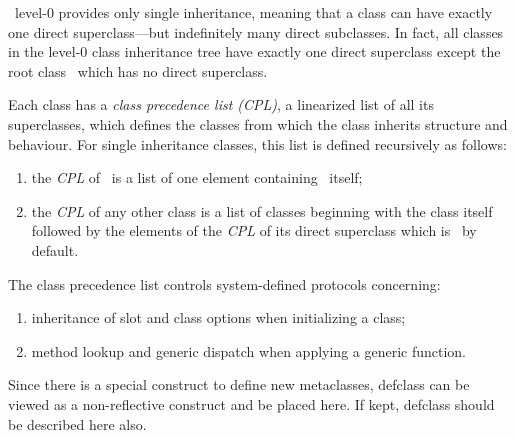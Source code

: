 \begin{optDefinition}
\noindent
\telos\ level-0 provides only single
inheritance, meaning that a class can have exactly one direct
superclass---but indefinitely many direct subclasses.  In fact, all classes in
the level-0 class inheritance tree have exactly one direct superclass except the
root class \ which has no direct superclass.

Each class has a {\em class precedence list (CPL)}, a linearized list of all its
superclasses, which defines the classes from which the class inherits structure
and behaviour. For single inheritance classes, this list is defined recursively
as follows:
\begin{enumerate}
    \item the {\em CPL\/} of \ is a list of one element
    containing \ itself;

    \item the {\em CPL\/} of any other class is a list of classes beginning with
    the class itself followed by the elements of the {\em CPL\/} of its direct
    superclass which is \ by default.
\end{enumerate}

The class precedence list controls system-defined protocols
concerning:
\begin{enumerate}
    \item inheritance of slot and class options when initializing a class;
    \item method lookup and generic dispatch when applying a generic function.
\end{enumerate}
\end{optDefinition}

\begin{optPrivate}
Since there is a special construct to define new metaclasses, defclass
can be viewed as a non-reflective construct and be placed here.  If
kept, defclass should be described here also.
\end{optPrivate}

